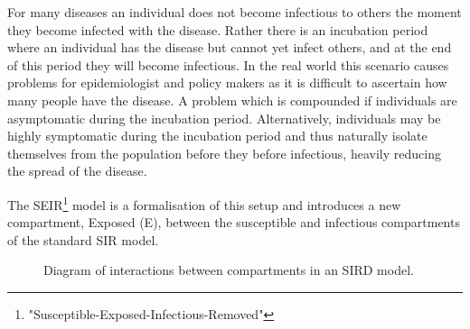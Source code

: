 \documentclass[11pt,a4paper]{article}
\theoremstyle{break}
\begin{document}
  \par For many diseases an individual does not become infectious to others the moment they become infected with the disease. Rather there is an incubation period where an individual has the disease but cannot yet infect others, and at the end of this period they will become infectious. In the real world this scenario causes problems for epidemiologist and policy makers as it is difficult to ascertain how many people have the disease. A problem which is compounded if individuals are asymptomatic during the incubation period. Alternatively, individuals may be highly symptomatic during the incubation period and thus naturally isolate themselves from the population before they before infectious, heavily reducing the spread of the disease.

  \par The SEIR\footnote{"Susceptible-Exposed-Infectious-Removed"} model is a formalisation of this setup and introduces a new compartment, Exposed (E), between the susceptible and infectious compartments of the standard SIR model.


  \begin{figure}[H]
    \centering
    \caption{Diagram of interactions between compartments in an SIRD model.}
    \label{fig_sird_model_diagram}
  \end{figure}
\end{document}
